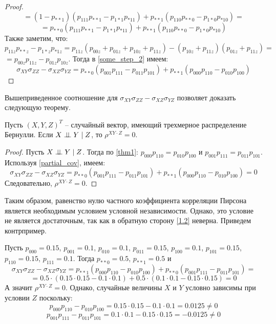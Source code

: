 \begin{proof}
$$    $$
    $$
        =(1-p_{**1})(p_{111}p_{**1}-p_{1*1}p_{*11})+p_{**1}(p_{110}p_{**0}-p_{1*0}p_{*10})=
    $$
    \begin{equation}\label{some_step_2}
        =p_{**0}(p_{111}p_{**1}-p_{1*1}p_{*11})+p_{**1}(p_{110}p_{**0}-p_{1*0}p_{*10})
    \end{equation}
    Также заметим, что:\\
    $
        p_{11z}p_{**z}-p_{1*z}p_{*1z} = p_{11z}(p_{00z}+p_{01z}+p_{10z}+p_{11z})-
        (p_{10z}+p_{11z})(p_{01z}+p_{11z})=
    $
    $
        = p_{00z}p_{11z}-p_{01z}p_{10z}
    $.
    Тогда в \eqref{some_step_2} имеем:
    $$
    \sigma_{XY} \sigma_{ZZ} - \sigma_{XZ} \sigma_{YZ} = p_{**0}(p_{001}p_{111}-p_{011}p_{101}) + p_{**1} (p_{000}p_{110}-p_{010}p_{100})
    $$
\end{proof}
Вышеприведенное соотношение для $\sigma_{XY} \sigma_{ZZ} - \sigma_{XZ} \sigma_{YZ}$ позволяет доказать следующую теорему.
\begin{theorem}\label{1.2}
    Пусть $(X,Y,Z)^T$ -- случайный вектор, имеющий трехмерное распределение Бернулли.
    Если $X \perp\!\!\!\perp Y \mid Z$, то $\rho^{XY \cdot Z}=0$.
\end{theorem}
\begin{proof}
    Пусть $X \perp\!\!\!\perp Y \mid Z$. Тогда по \autoref{thm1}:
    $p_{000}p_{110}=p_{010}p_{100}$ и 
    $p_{001}p_{111}=p_{011}p_{101}$.
    Используя \autoref{partial_cov}, имеем:
    $$
    \sigma_{XY} \sigma_{ZZ} - \sigma_{XZ} \sigma_{YZ}=p_{**0}(p_{001}p_{111}-p_{011}p_{101}) + p_{**1} (p_{000}p_{110}-p_{010}p_{100})= 0
    $$
    Следовательно, $\rho^{XY \cdot Z}=0$.
\end{proof}
Таким образом, равенство нулю частного коэффициента корреляции Пирсона является необходимым условием условной независимости.
Однако, это условие не является достаточным, так как в обратную сторону \autoref{1.2} неверна. Приведем контрпример.
\begin{example}
    Пусть $p_{000}=0.15$, $p_{001}=0.1$, $p_{010}=0.1$, $p_{011}=0.15$, $p_{100}=0.1$, $p_{101}=0.15$, $p_{110}=0.15$, $p_{111}=0.1$.
    Тогда $p_{**0}=0.5$, $p_{**1}=0.5$ и
    $$\sigma_{XY} \sigma_{ZZ} - \sigma_{XZ} \sigma_{YZ} = p_{**1}(p_{000}p_{110}-p_{010}p_{100}) + p_{**0}(p_{001}p_{111}-p_{011}p_{101})=$$
    $$=0.5 \cdot (0.15 \cdot 0.15 - 0.1 \cdot 0.1) + 0.5 \cdot (0.1 \cdot 0.1 - 0.15 \cdot 0.15) = 0$$
    А значит $\rho^{XY\cdot Z}=0$.
    Однако, случайные величины $X$ и $Y$ условно зависимы при условии $Z$ поскольку:
    $$
        p_{000}p_{110}-p_{010}p_{100}=0.15 \cdot 0.15 - 0.1 \cdot 0.1 = 0.0125 \neq 0
    $$
    $$
        p_{001}p_{111}-p_{011}p_{101}=0.1 \cdot 0.1 - 0.15 \cdot 0.15 = -0.0125 \neq 0
    $$
\end{example}

